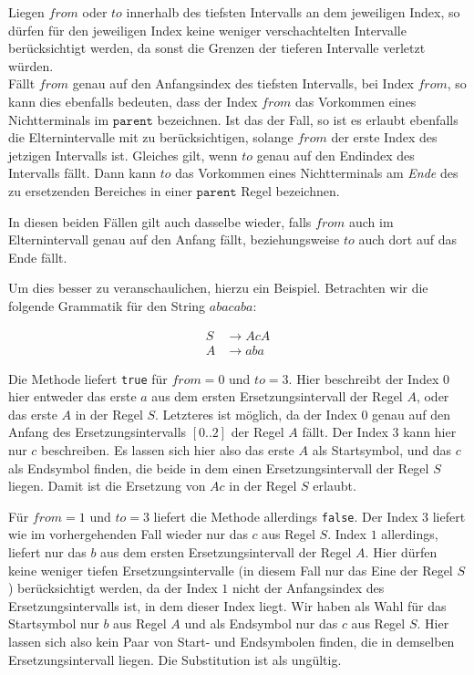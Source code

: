 Liegen $from$ oder $to$ innerhalb des tiefsten Intervalls an dem jeweiligen Index, so dürfen für den jeweiligen Index keine weniger verschachtelten Intervalle berücksichtigt werden, da sonst die Grenzen der tieferen Intervalle verletzt würden.\\ 
Fällt $from$ genau auf den Anfangsindex des tiefsten Intervalls, bei Index $from$, so kann dies ebenfalls bedeuten, dass der Index $from$ das Vorkommen eines Nichtterminals im $\texttt{parent}$ bezeichnen. Ist das der Fall, so ist es erlaubt ebenfalls die Elternintervalle mit zu berücksichtigen, solange $from$ der erste Index des jetzigen Intervalls ist. Gleiches gilt, wenn $to$ genau auf den Endindex des Intervalls fällt. Dann kann $to$ das Vorkommen eines Nichtterminals am \textit{Ende} des zu ersetzenden Bereiches in einer $\texttt{parent}$ Regel bezeichnen.

In diesen beiden Fällen gilt auch dasselbe wieder, falls $from$ auch im Elternintervall genau auf den Anfang fällt, beziehungsweise $to$ auch dort auf das Ende fällt.

Um dies besser zu veranschaulichen, hierzu ein Beispiel. Betrachten wir die folgende Grammatik für den String $abacaba$:

\begin{align*}
    S &\rightarrow AcA\\
    A &\rightarrow aba
\end{align*}

Die Methode liefert \texttt{true} für $from=0$ und $to=3$. Hier beschreibt der Index $0$ hier entweder das erste $a$ aus dem ersten Ersetzungsintervall der Regel $A$, oder das erste $A$ in der Regel $S$. Letzteres ist möglich, da der Index $0$ genau auf den Anfang des Ersetzungsintervalls $[0..2]$ der Regel $A$ fällt. Der Index $3$ kann hier nur $c$ beschreiben.
Es lassen sich hier also das erste $A$ als Startsymbol, und das $c$ als Endsymbol finden, die beide in dem einen Ersetzungsintervall der Regel $S$ liegen. Damit ist die Ersetzung von $Ac$ in der Regel $S$ erlaubt.

Für $from=1$ und $to=3$ liefert die Methode allerdings \texttt{false}. Der Index $3$ liefert wie im vorhergehenden Fall wieder nur das $c$ aus Regel $S$.
Index $1$ allerdings, liefert nur das $b$ aus dem ersten Ersetzungsintervall der Regel $A$. Hier dürfen keine weniger tiefen Ersetzungsintervalle (in diesem Fall nur das Eine der Regel $S$) berücksichtigt werden, da der Index $1$ nicht der Anfangsindex des Ersetzungsintervalls ist, in dem dieser Index liegt.
Wir haben als Wahl für das Startsymbol nur $b$ aus Regel $A$ und als Endsymbol nur das $c$ aus Regel $S$. Hier lassen sich also kein Paar von Start- und Endsymbolen finden, die in demselben Ersetzungsintervall liegen. Die Substitution ist als ungültig.


